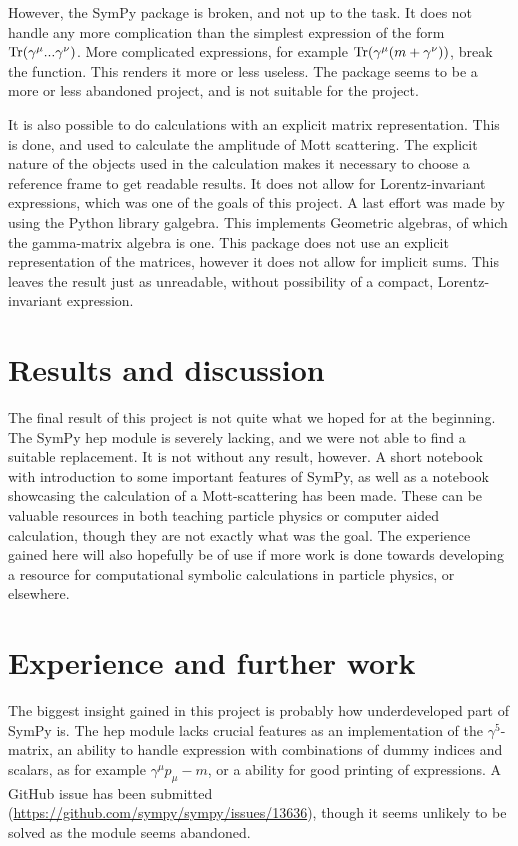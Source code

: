 \documentclass{article}
\begin{document}
    However, the SymPy package is broken, and not up to the task. It does not handle any more complication than the simplest expression of the form $\Tr(\gamma^\mu ... \gamma^\nu)$. More complicated expressions, for example $\Tr(\gamma^\mu (m + \gamma^\nu))$, break the function. This renders it more or less useless. The package seems to be a more or less abandoned project, and is not suitable for the project.
    
    It is also possible to do calculations with an explicit matrix representation. This is done, and used to calculate the amplitude of Mott scattering. The explicit nature of the objects used in the calculation makes it necessary to choose a reference frame to get readable results. It does not allow for Lorentz-invariant expressions, which was one of the goals of this project. A last effort was made by using the Python library galgebra. This implements Geometric algebras, of which the gamma-matrix algebra is one. This package does not use an explicit representation of the matrices, however it does not allow for implicit sums. This leaves the result just as unreadable, without possibility of a compact, Lorentz-invariant expression.
    
    \section*{Results and discussion}
    The final result of this project is not quite what we hoped for at the beginning. The SymPy hep module is severely lacking, and we were not able to find a suitable replacement. It is not without any result, however. A short notebook with introduction to some important features of SymPy, as well as a notebook showcasing the calculation of a Mott-scattering has been made. These can be valuable resources in both teaching particle physics or computer aided calculation, though they are not exactly what was the goal. The experience gained here will also hopefully be of use if more work is done towards developing a resource for computational symbolic calculations in particle physics, or elsewhere.

    \section*{Experience and further work}
    The biggest insight gained in this project is probably how underdeveloped part of SymPy is. The hep module lacks crucial features as an implementation of the $\gamma^5$-matrix, an ability to handle expression with combinations of dummy indices and scalars, as for example $\gamma^\mu p_\mu - m$, or a ability for good printing of expressions. A GitHub issue has been submitted (\url{https://github.com/sympy/sympy/issues/13636}), though it seems unlikely to be solved as the module seems abandoned.
\end{document}
